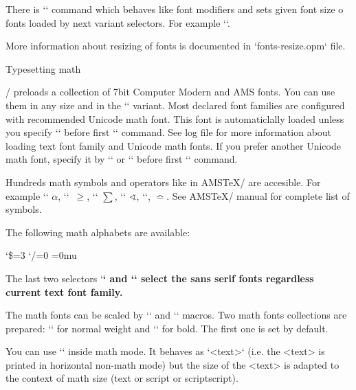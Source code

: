 \new
There is `` command which behaves like
font modifiers and sets given font size o fonts loaded by next variant selectors. 
For example `\currvar`.

More information about resizing of fonts is documented in `fonts-resize.opm`
file. 

\secc Typesetting math

\OpTeX/ preloads a collection of 7bit Computer Modern and AMS fonts.
You can use them in any size and in the `\boldmath` variant. 
%
\new 
Most declared font families are configured with recommended Unicode
math font. This font is automaticlally loaded unless you specify
`\noloadmath` before first `\fontfam` command. See log file for more
information about loading text font family and Unicode math fonts. If you
prefer another Unicode math font, specify it by ``
or `` before first `\loadfam` command.

Hundreds math symbols and operators like in AMS\TeX/ are accesible. 
For example  `\alpha` $\alpha$, `\geq`~$\geq$, `\sum` $\sum$, 
`\sphericalangle` $\sphericalangle$, `\bumpeq`, $\bumpeq$. See AMS\TeX/
manual for complete list of symbols.

The following math alphabets are available:

\begtt    \catcode`\$=3 \catcode`/=0 \medmuskip=0mu \adef{ }{ }
\mit     %
\it      %
\rm      %
\cal     %
\script  %
\frak    %
\bbchar  %
\bf      %
\bi      %
\endtt

The last two selectors `\bf` and `\bi` select the sans serif fonts regardless
current text font family. 

The math fonts can be scaled by `\typosize` and `\typoscale` macros.
Two math fonts collections are prepared: `\normalmath` for normal weight
and `\boldmath` for bold. The first one is set by default.

\new
You can use `` inside math mode. It behaves as `{\hbox{<text>}}`
(i.e. the <text> is printed in horizontal non-math mode)
but the size of the <text> is adapted to the context of math size (text or script or
scriptscript). 


